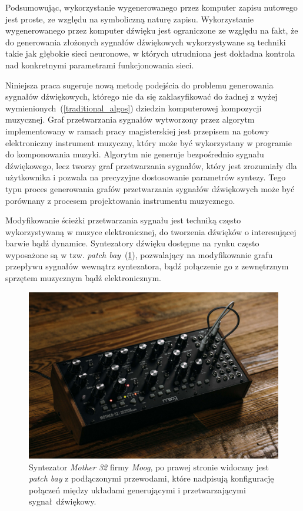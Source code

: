 Podsumowując, wykorzystanie wygenerowanego przez komputer zapisu nutowego jest proste,
ze względu na symboliczną naturę zapisu.
Wykorzystanie wygenerowanego przez komputer dźwięku jest ograniczone ze względu na fakt,
że do generowania złożonych sygnałów dźwiękowych wykorzystywane są techniki takie jak
głębokie sieci neuronowe, w których utrudniona jest dokładna kontrola nad konkretnymi
parametrami funkcjonowania sieci.

Niniejsza praca sugeruje nową metodę podejścia do problemu generowania sygnałów dźwiękowych,
którego nie da się zaklasyfikować do żadnej z wyżej wymienionych~(\ref{traditional_algos}) dziedzin komputerowej kompozycji muzycznej.
Graf przetwarzania sygnałów wytworzony przez algorytm implementowany w ramach pracy magisterskiej jest przepisem na gotowy elektroniczny instrument muzyczny,
który może być wykorzystany w programie do komponowania muzyki. Algorytm nie generuje bezpośrednio sygnału dźwiękowego, lecz tworzy
graf przetwarzania sygnałów, który jest zrozumiały dla użytkownika i pozwala na precyzyjne dostosowanie parametrów syntezy.
Tego typu proces generowania grafów przetwarzania sygnałów dźwiękowych może być porównany z procesem projektowania instrumentu muzycznego.

Modyfikowanie ścieżki przetwarzania sygnału jest techniką często wykorzystywaną w muzyce
elektronicznej, do tworzenia dźwięków o interesującej barwie bądź dynamice. Syntezatory dźwięku
dostępne na rynku często wyposażone są w tzw. \textit{patch bay}~(\ref{fig:mother32}), pozwalający na modyfikowanie
grafu przepływu sygnałów wewnątrz syntezatora, bądź połączenie go z zewnętrznym sprzętem muzycznym
bądź elektronicznym.

\begin{figure}[H]
    \centering
    \includegraphics[width=0.7\linewidth]{rys01/mother32.jpg}
    \caption{
      Syntezator \textit{Mother 32} firmy \textit{Moog}, po prawej stronie widoczny
      jest \textit{patch bay} z podłączonymi przewodami, które nadpisują konfigurację
      połączeń między układami generującymi i przetwarzającymi sygnał dźwiękowy.
    }\label{fig:mother32}
\end{figure}


